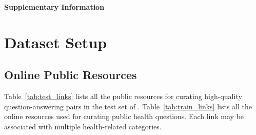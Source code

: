 \renewcommand{\thesection}{S\arabic{section}}
\setcounter{section}{0}
\renewcommand{\thetable}{S\arabic{table}}
\setcounter{table}{0}
\renewcommand{\thefigure}{S\arabic{figure}}
\setcounter{figure}{0}
\renewcommand{\theequation}{S\arabic{equation}}
\setcounter{equation}{0}

\begin{center}
{\large \textbf{Supplementary Information}}
\end{center}

\section{Dataset Setup}\label{app:dataset}

\subsection{Online Public Resources}\label{app:online}

Table~\ref{tab:test_links} lists all the public resources for curating high-quality question-answering pairs in the test set of \repqa.
Table~\ref{tab:train_links} lists all the online resources used for curating public health questions. Each link may be associated with multiple health-related categories.


